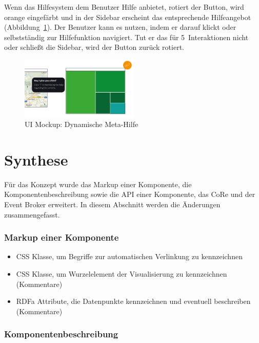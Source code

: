 \documentclass[
	headsepline,
	footsepline,
	fontsize=12pt,
	bibliography=totoc
]{scrbook}
\begin{document}
Wenn das Hilfesystem dem Benutzer Hilfe anbietet, rotiert der Button, wird orange eingefärbt und in der Sidebar erscheint das entsprechende Hilfeangebot (Abbildung~\ref{figure:meta-dyn}). Der Benutzer kann es nutzen, indem er darauf klickt oder selbstständig zur Hilfefunktion navigiert. Tut er das für 5~Interaktionen nicht oder schließt die Sidebar, wird der Button zurück rotiert. 

\begin{figure}[htbp]
   \centering
   \includegraphics[width=0.5\textwidth]{images/konzeption-meta-dyn.png}
   \caption{UI Mockup: Dynamische Meta-Hilfe}
   \label{figure:meta-dyn}
\end{figure}

\section{Synthese}
\label{section:konzeption:synthese}

Für das Konzept wurde das Markup einer Komponente, die Komponentenbeschreibung sowie die API einer Komponente, das CoRe und der Event Broker erweitert. In diesem Abschnitt werden die Änderungen zusammengefasst.

\subsubsection{Markup einer Komponente}

\begin{itemize}
	\item CSS Klasse, um Begriffe zur automatischen Verlinkung zu kennzeichnen
	\item CSS Klasse, um Wurzelelement der Visualisierung zu kennzeichnen (Kommentare)
	\item RDFa Attribute, die Datenpunkte kennzeichnen und eventuell beschreiben (Kommentare)
\end{itemize}

\subsubsection{Komponentenbeschreibung}
\end{document}
